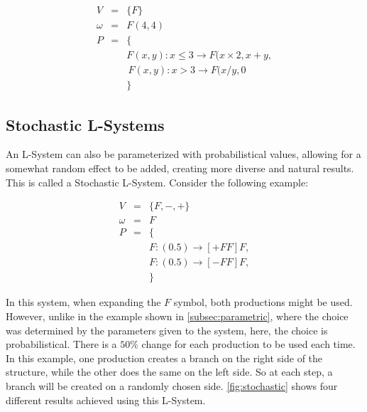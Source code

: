 \documentclass{acmtog}
\begin{document}
\begin{eqnarray*}
  V       &=& \{F\}                                               \\
  \omega  &=& F(4,4)                                              \\
  P       &=& \{                                                  \\
          & & F(x,y) : x \leq 3 \rightarrow F(x \times 2, x + y,  \\
          & & \, F(x,y) : x >    3 \rightarrow F(x / y, 0\        \\
          & & \}                                                  
  \label{eq:example3}
\end{eqnarray*}

\subsection{Stochastic L-Systems}
\label{subsec:stochastic}

An L-System can also be parameterized with probabilistical values, allowing for a somewhat random effect to be added, creating more diverse and natural results. This is called a Stochastic L-System. Consider the following example:

\begin{eqnarray*}
  V       &=& \{F, -, +\}                   \\
  \omega  &=& F                             \\
  P       &=& \{                            \\
          & & F : (0.5) \rightarrow [+FF]F, \\
          & & F : (0.5) \rightarrow [-FF]F, \\
          & & \}                            
  \label{eq:example4}
\end{eqnarray*}

In this system, when expanding the $F$ symbol, both productions might be used. However, unlike in the example shown in \autoref{subsec:parametric}, where the choice was determined by the parameters given to the system, here, the choice is probabilistical. There is a $50\%$ change for each production to be used each time. In this example, one production creates a branch on the right side of the structure, while the other does the same on the left side. So at each step, a branch will be created on a randomly chosen side. \autoref{fig:stochastic} shows four different results achieved using this L-System.
\end{document}
